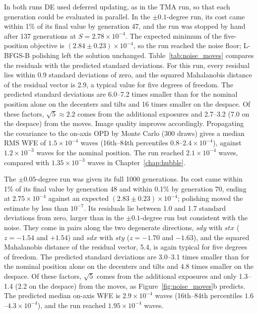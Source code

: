In both runs DE used deferred updating, as in the TMA run, so that each generation could be evaluated in parallel. In the $\pm0.1$-degree run, its cost came within 1\% of its final value by generation 47, and the run was stopped by hand after 137 generations at $S=2.78\times10^{-4}$. The expected minimum of the five-position objective is $(2.84\pm0.23)\times10^{-4}$, so the run reached the noise floor; L-BFGS-B polishing left the solution unchanged. Table~\ref{tab:noise_moves} compares the residuals with the predicted standard deviations. For this run, every residual lies within 0.9 standard deviations of zero, and the squared Mahalanobis distance of the residual vector is 2.9, a typical value for five degrees of freedom. The predicted standard deviations are 6.0--7.2 times smaller than for the nominal position alone on the decenters and tilts and 16 times smaller on the despace. Of these factors, $\sqrt{5}\approx2.2$ comes from the additional exposures and 2.7--3.2 (7.0 on the despace) from the moves. Image quality improves accordingly. Propagating the covariance to the on-axis OPD by Monte Carlo (300 draws) gives a median RMS WFE of $1.5\times10^{-4}$ waves (16th--84th percentiles $0.8$--$2.4\times10^{-4}$), against $1.2\times10^{-3}$ waves for the nominal position. The run reached $2.1\times10^{-4}$ waves, compared with $1.35\times10^{-3}$ waves in Chapter~\ref{chap:hubble}.

The $\pm0.05$-degree run was given its full 1000 generations. Its cost came within 1\% of its final value by generation 48 and within 0.1\% by generation 70, ending at $2.75\times10^{-4}$ against an expected $(2.83\pm0.23)\times10^{-4}$; polishing moved the estimate by less than $10^{-7}$. Its residuals lie between 1.0 and 1.7 standard deviations from zero, larger than in the $\pm0.1$-degree run but consistent with the noise. They come in pairs along the two degenerate directions, $sdy$ with $stx$ ($z=-1.54$ and $+1.54$) and $sdx$ with $sty$ ($z=-1.70$ and $-1.63$), and the squared Mahalanobis distance of the residual vector, 5.4, is again typical for five degrees of freedom. The predicted standard deviations are 3.0--3.1 times smaller than for the nominal position alone on the decenters and tilts and 4.8 times smaller on the despace. Of these factors, $\sqrt{5}$ comes from the additional exposures and only 1.3--1.4 (2.2 on the despace) from the moves, as Figure~\ref{fig:noise_moves}b predicts. The predicted median on-axis WFE is $2.9\times10^{-4}$ waves (16th--84th percentiles $1.6$--$4.3\times10^{-4}$), and the run reached $1.95\times10^{-4}$ waves.

